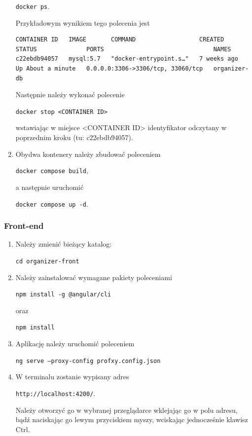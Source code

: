 \documentclass[a4paper,twoside,12pt]{book}
\begin{document}
\begin{enumerate}
	\texttt{docker ps}.

	Przykładowym wynikiem tego polecenia jest

	\begin{verbatim}
CONTAINER ID   IMAGE       COMMAND                  CREATED       STATUS              PORTS                               NAMES
c22ebdb94057   mysql:5.7   "docker-entrypoint.s…"   7 weeks ago   Up About a minute   0.0.0.0:3306->3306/tcp, 33060/tcp   organizer-db
	\end{verbatim}

	Następnie należy wykonać polecenie

	\texttt{docker stop <CONTAINER ID>}

	wstawiając w miejsce <CONTAINER ID> identyfikator odczytany w poprzednim kroku (tu: c22ebdb94057).

	\item Obydwa kontenery należy zbudować poleceniem 

	\texttt{docker compose build},

	a następnie uruchomić 

	\texttt{docker compose up -d}.
    \end{enumerate}

\subsubsection{Front-end}

\begin{enumerate}
	 \item Należy zmienić bieżący katalog:

	 \texttt{cd organizer-front}

	 \item Należy zainstalować wymagane pakiety poleceniami

	 \texttt{npm install -g @angular/cli} 
	 
	 oraz
	 
	 \texttt{npm install}

	 \item Aplikację należy uruchomić poleceniem

	 \texttt{ng serve --proxy-config profxy.config.json}

	 \item W terminalu zostanie wypisany adres 

	 \texttt{http://localhost:4200/}.

	Należy otworzyć go w wybranej przeglądarce wklejając go w polu adresu, bądź naciskając go lewym przyciskiem myszy, wciskając jednocześnie klawisz Ctrl.

	 \end{enumerate}
\end{document}
